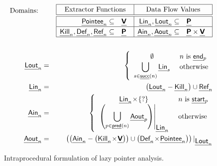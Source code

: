 \documentclass{llncs}
\newcommand{\End}[1]{\text{{\sf\em end}$_{#1}$}\xspace}
\newcommand{\Start}[1]{\text{{\sf\em start}$_{#1}$}\xspace}
\newcommand{\pred}{\text {\sf\em{pred}\/}}
\newcommand{\Succ}{\text{\sf\em {succ}\/}}
\newcommand{\var}{\text{\sf\bfseries\em V}\xspace}
\newcommand{\pointer}{\text{\sf\bfseries\em P}\xspace}
\newcommand{\lin}{\text{{\sf\em Lin\/}}\xspace}
\newcommand{\ain}{\text{{\sf\em Ain\/}}\xspace}
\newcommand{\lout}{\text{{\sf\em Lout\/}}\xspace}
\newcommand{\aout}{\text{{\sf\em Aout\/}}\xspace}
\newcommand{\Def}{\text{{\sf\em Def}}\xspace}
\newcommand{\Pointee}{\text{{\sf\em Pointee}}\xspace}
\newcommand{\Kill}{\text{{\sf\em Kill}}\xspace}
\newcommand{\Ref}{\text{{\sf\em Ref}}\xspace} \newcommand{\sRef}{\text{{\sf\em sRef}}\xspace}
\newcommand{\lrestrict}[2]{\text{$\protect#1{\mid}_{\protect#2}$}}
\begin{document}
\begin{figure}[!t]
\begin{eqnarray}
\begin{array}{c}
	\text{Domains:}\rule[-3.3em]{0em}{4em}
\end{array}
	&
	&
\begin{array}{|rl|rl|}
\hline
\multicolumn{2}{|c|}{\text{Extractor Functions}}
	& \multicolumn{2}{c|}{\text{Data Flow Values}}
	\\ \hline\hline
\Pointee_n  \subseteq  & \var\; \;& \lin_n, \lout_n \subseteq &  \pointer\; \;
		\\ \hline
\Kill_n, \Def_n, \Ref_n  \subseteq  & \pointer\; \;&
\ain_n, \aout_n  \subseteq & \pointer \times \var\;\; 
		\\ \hline
\end{array}
\nonumber \\
\nonumber \\
\lout_n & = & 
	\left\{
		\begin{array}{c@{\ \ \ \ }l}
			\emptyset 	& n \text{ is } \End{p}
				\\
			\displaystyle\bigcup_{s \in \Succ(n)} \lin_s
				& \text{otherwise}
		\end{array}
	\right.
	\label{eq:lout.exhaustive}
	\\
\lin_n & = & 
                \left(\lout_n - \Kill_n\right) \cup \Ref_n 
	\label{eq:lin.exhaustive}
	\\
\ain_n & = & 
	\left\{ \renewcommand{\arraystretch}{1.2}
		\begin{array}{c@{\ \ \ \ }l}
			\lin_n \!\times\! \{?\}
                                & n \text{ is } \Start{p}
				\\
		\left.
		\left(\displaystyle\bigcup_{p \in \pred(n)} \aout_p\right)
		\right|_{\mbox{$\lin_n$}}
& \text{otherwise}
		\end{array}
	\right.
	\label{eq:ain.exhaustive}
	\\
\aout_n & = & 
\lrestrict{
                \left(\left(\ain_n  -  \left(\Kill_n \!\times\! \var\right)\right) \cup 
			\left( \Def_n \!\times\! \Pointee_n\right)\right)
}{\mbox{$\lout_n$}}
\label{eq:aout.exhaustive}
\end{eqnarray}
\caption{Intraprocedural formulation of lazy pointer analysis.}
\label{fig:lazy.pta.dfe}
\end{figure}
\end{document}
